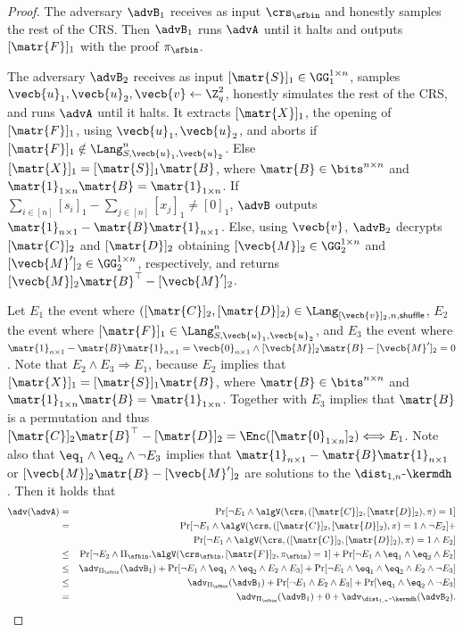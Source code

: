 \begin{proof}
The adversary $\advB_1$ receives as input $\crs_\sfbin$ and honestly samples the rest of the CRS. Then $\advB_1$ runs $\advA$ until it halts and outputs $[\matr{F}]_1$ with the proof $\pi_\sfbin$.

The adversary $\advB_2$ receives as input $[\matr{S}]_1\in\GG_1^{1\times n}$, samples $\vecb{u}_1,\vecb{u}_2,\vecb{v}\gets \Z_q^2$, honestly simulates the rest of the CRS, and runs $\advA$ until it halts. It extracts $[\matr{X}]_1$, the opening of $[\matr{F}]_1$, using $\vecb{u}_1,\vecb{u}_2$, and aborts if $[\matr{F}]_1\notin\Lang_{S,\vecb{u}_1,\vecb{u}_2}^n$. Else $[\matr{X}]_1=[\matr{S}]_1\matr{B}$, where $\matr{B}\in\bits^{n\times n}$ and $\matr{1}_{1\times n}\matr{B}=\matr{1}_{1\times n}$. If $\sum_{i\in[n]}[s_i]_1-\sum_{j\in[n]}[x_j]_1\neq[0]_1$, $\advB$ outputs $\matr{1}_{n\times 1}-\matr{B}\matr{1}_{n\times 1}$. Else, using $\vecb{v}$, $\advB_2$ decrypts $[\matr{C}]_2$ and $[\matr{D}]_2$ obtaining $[\vecb{M}]_2\in\GG_2^{1\times n}$ and $[\vecb{M}']_2\in\GG_2^{1\times n}$, respectively, and returns $[\vecb{M}]_2\matr{B}^\top-[\vecb{M}']_2$.

Let $E_1$ the event where $([\matr{C}]_2,[\matr{D}]_2)\in\Lang_{[\vecb{v}]_2,n,\mathsf{shuffle}}$, $E_2$ the event where $[\matr{F}]_1\in\Lang_{S,\vecb{u}_1,\vecb{u}_2}^n$, and $E_3$ the event where $\matr{1}_{n\times 1}-\matr{B}\matr{1}_{n\times 1}=\vecb{0}_{n\times 1}\wedge[\vecb{M}]_2\matr{B}-[\vecb{M}']_2=0$. Note that $E_2\wedge E_3\Longrightarrow E_1$, because $E_2$ implies that $[\matr{X}]_1=[\matr{S}]_1\matr{B}$, where $\matr{B}\in\bits^{n\times n}$ and $\matr{1}_{1\times n}\matr{B}=\matr{1}_{1\times n}$. Together with $E_3$ implies that $\matr{B}$ is a permutation and thus $[\matr{C}]_2\matr{B}^\top-[\matr{D}]_2=\Enc([\matr{0}_{1\times n}]_2)\Longleftrightarrow E_1$. Note also that $\eq_1\wedge\eq_2\wedge\neg E_3$ implies that $\matr{1}_{n\times 1}-\matr{B}\matr{1}_{n\times 1}$ or $[\vecb{M}]_2\matr{B}-[\vecb{M}']_2$ are solutions to the $\dist_{1,n}\mbox{-}\kermdh$. Then it holds that
\begin{eqnarray*}
\adv(\advA) & = &
    \Pr[\neg E_1 \wedge \algV(\crs,([\matr{C}]_2,[\matr{D}]_2),\pi)=1]\\
& = &
    \Pr[\neg E_1 \wedge \algV(\crs,([\matr{C}]_2,[\matr{D}]_2),\pi)=1 \wedge \neg E_2]+\\
& &
    \Pr[\neg E_1 \wedge \algV(\crs,([\matr{C}]_2,[\matr{D}]_2),\pi)=1 \wedge E_2]\\
& \leq &
    \Pr[\neg E_2 \wedge \Pi_\sfbin.\algV(\crs_\sfbin,[\matr{F}]_2,\pi_\sfbin)=1]+
    \Pr[\neg E_1 \wedge \eq_1 \wedge \eq_2 \wedge E_2]\\
& \leq &
    \adv_{\Pi_\sfbin}(\advB_1)+\Pr[\neg E_1 \wedge \eq_1 \wedge \eq_2 \wedge E_2\wedge E_3] + \Pr[\neg E_1 \wedge \eq_1 \wedge \eq_2 \wedge E_2\wedge \neg E_3]\\
& \leq &
    \adv_{\Pi_\sfbin}(\advB_1) + \Pr[\neg E_1\wedge E_2 \wedge E_3]+
    \Pr[\eq_1\wedge\eq_2\wedge\neg E_3]\\
& = &
    \adv_{\Pi_\sfbin}(\advB_1)+0+\adv_{\dist_{1,n}\mbox{-}\kermdh}(\advB_2).
\end{eqnarray*} 
\end{proof}

